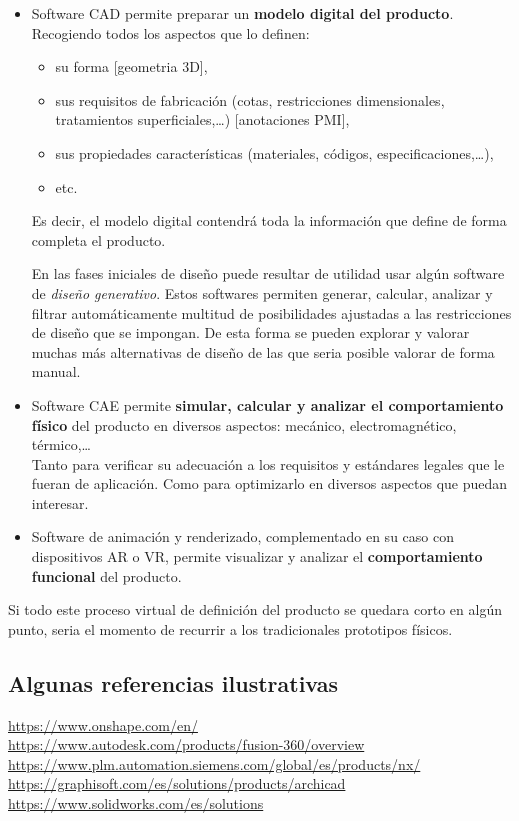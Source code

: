 \documentclass[spanish,12pt,a4paper,final,oneside]{book}
\begin{document}
\begin{itemize}
\item Software CAD permite preparar un \textbf{modelo digital del producto}. Recogiendo todos los aspectos que lo definen:
\begin{itemize}
\item su forma [geometria 3D],  
\item sus requisitos de fabricación (cotas, restricciones dimensionales, tratamientos superficiales,\ldots) [anotaciones PMI], 
\item sus propiedades características (materiales, códigos, especificaciones,\ldots), 
\item etc.
\end{itemize}

Es decir, el modelo digital contendrá toda la información que define de forma completa el producto.

En las fases iniciales de diseño puede resultar de utilidad usar algún software de \textit{diseño generativo}. Estos softwares permiten generar, calcular, analizar y filtrar automáticamente multitud de posibilidades ajustadas a las restricciones de diseño que se impongan. De esta forma se pueden explorar y valorar muchas más  alternativas de diseño de las que seria posible valorar de forma manual.

\item Software CAE permite \textbf{simular, calcular y analizar el comportamiento físico} del producto en diversos aspectos: mecánico, electromagnético, térmico,\ldots
\\Tanto para verificar su adecuación a los requisitos y estándares legales que le fueran de aplicación. Como para optimizarlo en diversos aspectos que puedan interesar.

\item Software de animación y renderizado, complementado en su caso con dispositivos AR o VR, permite visualizar y analizar el \textbf{comportamiento funcional} del producto.
\end{itemize}

Si todo este proceso virtual de definición del producto se quedara corto en algún punto, seria el momento de recurrir a los tradicionales prototipos físicos.

\subsection*{Algunas referencias ilustrativas}
\url{https://www.onshape.com/en/}
\\ \url{https://www.autodesk.com/products/fusion-360/overview}
\\ \url{https://www.plm.automation.siemens.com/global/es/products/nx/}
\\ \url{https://graphisoft.com/es/solutions/products/archicad}
\\ \url{https://www.solidworks.com/es/solutions}
\end{document}
